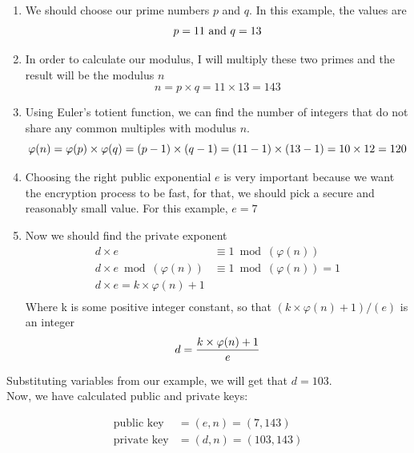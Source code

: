 \documentclass[a4paper, 12pt]{article}
\begin{document}
\begin{enumerate}
\item We should choose our prime numbers $p$ and $q$. In this example, the values are
  \begin{equation*}
    p=11 \text{ and } q=13\\
  \end{equation*}
  \item In order to calculate our modulus, I will multiply these two primes and the result will be
    the modulus $n$
    \begin{equation*}
      n=p \times q=11 \times 13=143
    \end{equation*}
    \item Using Euler's totient function, we can find the number of integers that do not share any
      common multiples with modulus $n$.
      \begin{equation*}
        \varphi(n)=\varphi(p) \times \varphi(q)=(p-1) \times (q-1)=(11-1) \times (13-1)=10 \times 12=120\\
      \end{equation*}
      \item Choosing the right public exponential $e$ is very important because we want the encryption
process to be fast, for that, we should pick a secure and reasonably small value. For this
example, $e=7$

\item Now we should find the private exponent
  \begin{align*}
    d \times e &\equiv 1 \bmod(\varphi(n))\\
    d \times e \bmod(\varphi(n)) &\equiv 1 \bmod(\varphi(n)) =1\\
    d \times e = k \times \varphi(n) + 1\\
  \end{align*}
  Where k is some positive integer constant, so that $(k \times \varphi(n) + 1)/(e)$ is an integer
  \begin{equation*}
    d = \frac{k \times \varphi(n)+1}{e}\\
    \end{equation*}
\end{enumerate}

Substituting variables from our example, we will get that $d=103$.\\

Now, we have calculated public and private keys:

\begin{align*}
  \text{public key}&=(e,n)=(7,143)\\
  \text{private key}&=(d,n)=(103,143)\\
  \end{align*}
\end{document}
